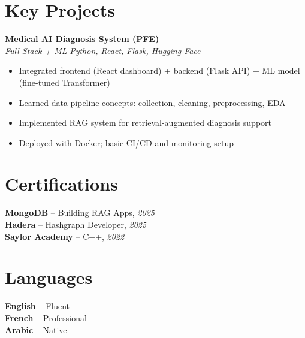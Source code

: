 \documentclass[10pt,a4paper]{article}
\begin{document}
\vspace{4pt}
\section*{Key Projects}
{\small
\textbf{Medical AI Diagnosis System (PFE)}\\[1pt]
\textit{Full Stack + ML} \hfill \textit{Python, React, Flask, Hugging Face}
\begin{itemize}
  \item Integrated frontend (React dashboard) + backend (Flask API) + ML model (fine-tuned Transformer)
  \item Learned data pipeline concepts: collection, cleaning, preprocessing, EDA
  \item Implemented RAG system for retrieval-augmented diagnosis support
  \item Deployed with Docker; basic CI/CD and monitoring setup
\end{itemize}
}

\vspace{3pt}
\section*{Certifications}
{\small
\textbf{MongoDB} -- Building RAG Apps, \textit{2025}\\[1pt]
\textbf{Hadera} -- Hashgraph Developer, \textit{2025}\\[1pt]
\textbf{Saylor Academy} -- C++, \textit{2022}
}

\section*{Languages}
{\small
\textbf{English} -- Fluent\\[1pt]
\textbf{French} -- Professional\\[1pt]
\textbf{Arabic} -- Native
}
\end{document}

